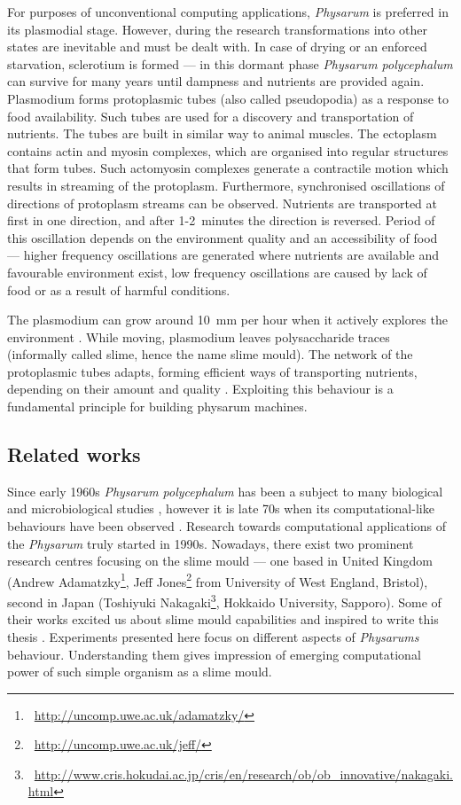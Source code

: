 For purposes of unconventional computing applications, \textit{Physarum} is preferred in its plasmodial stage. However, during the research transformations into other states are inevitable and must be dealt with. In case of drying or an enforced starvation, sclerotium is formed --- in this dormant phase \textit{Physarum polycephalum} can survive for many years until dampness and nutrients are provided again. Plasmodium forms protoplasmic tubes (also called pseudopodia) as a response to food availability. Such tubes are used for a discovery and transportation of nutrients. The tubes are built in similar way to animal muscles. The ectoplasm contains actin and myosin complexes, which are organised into regular structures that form tubes. Such actomyosin complexes generate a contractile motion which results in streaming of the protoplasm. Furthermore, synchronised oscillations of directions of protoplasm streams can be observed. Nutrients are transported at first in one direction, and after 1-2~minutes the direction is reversed. Period of this oscillation depends on the environment quality and an accessibility of food \cite{wohlfarth1979oscillatory} --- higher frequency oscillations are generated where nutrients are available and favourable environment exist, low frequency oscillations are caused by lack of food or as a result of harmful conditions. 

The plasmodium can grow around 10~mm per hour when it actively explores the environment \cite{coggin1996dynamic}. While moving, plasmodium leaves polysaccharide traces (informally called slime, hence the name slime mould). The network of the protoplasmic tubes adapts, forming efficient ways of transporting nutrients, depending on their amount and quality \cite{nakagaki2004obtaining}. Exploiting this behaviour is a fundamental principle for building physarum machines.


\subsection{Related works}

Since early 1960s \textit{Physarum polycephalum} has been a subject to many biological and microbiological studies \cite{guttes1964mitotic,daniel1962method}, however it is late 70s when its computational-like behaviours have been observed \cite{wohlfarth1979oscillatory}. Research towards computational applications of the \textit{Physarum} truly started in 1990s. Nowadays, there exist two prominent research centres focusing on the slime mould --- one based in United Kingdom (Andrew Adamatzky\footnote{~\url{http://uncomp.uwe.ac.uk/adamatzky/}}, Jeff Jones\footnote{~\url{http://uncomp.uwe.ac.uk/jeff/}} from University of West England, Bristol), second in Japan (Toshiyuki Nakagaki\footnote{~\url{http://www.cris.hokudai.ac.jp/cris/en/research/ob/ob\_innovative/nakagaki.html}}, Hokkaido University, Sapporo). Some of their works excited us about slime mould capabilities and inspired to write this thesis \cite{nakagaki2000intelligence,adamatzky2010physarum,jones2015pattern,adamatzky2007physarum}. Experiments presented here focus on different aspects of \textit{Physarums} behaviour. Understanding them gives impression of emerging computational power of such simple organism as a slime mould.


